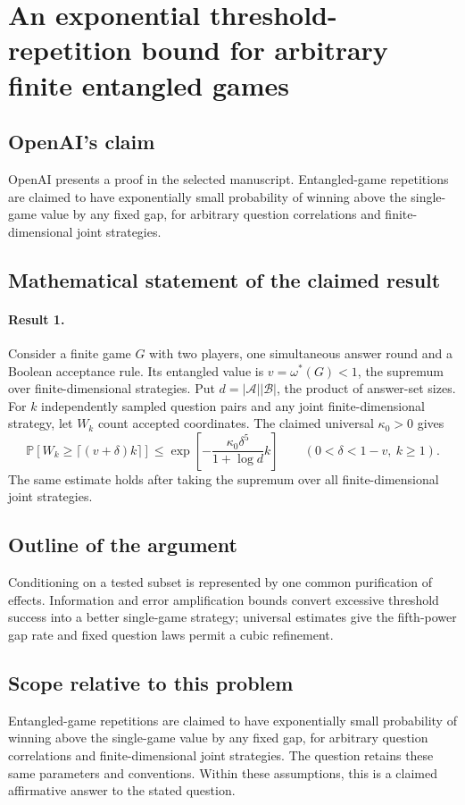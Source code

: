 \documentclass[11pt]{article}
\begin{document}
\section*{An exponential threshold-repetition bound for arbitrary finite entangled games}

\subsection{OpenAI's claim}
OpenAI presents a proof in the selected manuscript. Entangled-game repetitions are claimed to have exponentially small probability of winning above the single-game value by any fixed gap, for arbitrary question correlations and finite-dimensional joint strategies.

\subsection{Mathematical statement of the claimed result}
\paragraph{Result 1.} Consider a finite game \(G\) with two players, one simultaneous answer round and a Boolean acceptance rule. Its entangled value is \(v=\omega^*(G)<1\), the supremum over finite-dimensional strategies. Put \(d=|\mathcal A||\mathcal B|\), the product of answer-set sizes. For \(k\) independently sampled question pairs and any joint finite-dimensional strategy, let \(W_k\) count accepted coordinates. The claimed universal \(\kappa_0>0\) gives
\[
 \mathbb P[W_k\ge\lceil(v+\delta)k\rceil]
 \le\exp\!\left[-\frac{\kappa_0\delta^5}{1+\log d}k\right]
 \qquad(0<\delta<1-v,\ k\ge1).
\]
The same estimate holds after taking the supremum over all finite-dimensional joint strategies.

\subsection{Outline of the argument}
Conditioning on a tested subset is represented by one common purification of effects. Information and error amplification bounds convert excessive threshold success into a better single-game strategy; universal estimates give the fifth-power gap rate and fixed question laws permit a cubic refinement.

\subsection{Scope relative to this problem}
Entangled-game repetitions are claimed to have exponentially small probability of winning above the single-game value by any fixed gap, for arbitrary question correlations and finite-dimensional joint strategies. The question retains these same parameters and conventions. Within these assumptions, this is a claimed affirmative answer to the stated question.
\end{document}
